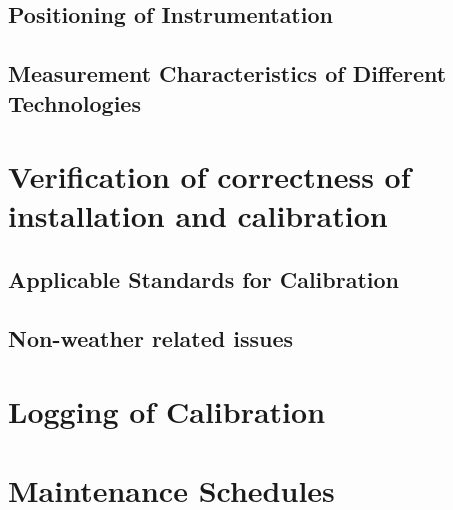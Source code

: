 \subsection{Positioning of Instrumentation}\label{ssec:selection-of-height}
{\color{magenta}{Discuss vertical location specifics and at which heights above ground measurements are needed to provide representative information.}}



\subsection{Measurement Characteristics of Different Technologies}\label{subsec:measurement-characteristics}
{\color{magenta}{Discussion of conceptual differences in measurements from anemometers on met masts (point measurements), remote sensing devices (lidar,sodar - which are some type of volume average) and nacelle mounted anemometers (very representative of height and location of turbines but obstructed). }}

\section{Verification of correctness of installation and calibration }\label{sec:installation-veification}

\subsection{Applicable Standards for Calibration }\label{sec:calibration-standards}

\subsection{Non-weather related issues }\label{sec:nonweather}
 
\section{Logging of Calibration }\label{sec:logging-of-calibration}

\section{Maintenance Schedules }\label{sec:maintenance-schedules}








